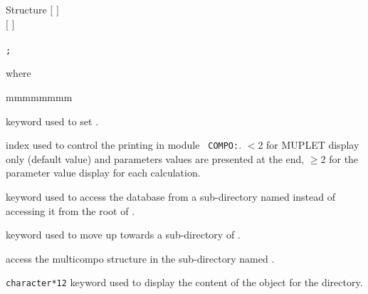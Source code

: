 \vskip -0.5cm

\begin{DataStructure}{Structure }
$[$   $]$ \\
$[$    $]$ \\
  \\
{\tt ;}
\end{DataStructure}

\noindent where
\begin{ListeDeDescription}{mmmmmmmm}

\item[\moc{EDIT}] keyword used to set .

\item[\dusa{iprint}] index used to control the printing in module {\tt
COMPO:}. $<$2 for MUPLET display only (default value) and parameters values are presented at the end, $\ge$2 for the parameter value display for each calculation.

\item[\moc{STEP}] keyword used to access the database from a sub-directory named  instead of
accessing it from the root of .

\item[\moc{UP}] keyword used to move up towards a sub-directory of .

\item[\dusa{NAMDIR}] access the {\sc multicompo} structure in the sub-directory named .

\item[\moc{DB-STRUC}] {\tt character*12} keyword used to display the content of the  object for the  directory.

\end{ListeDeDescription}

\clearpage
